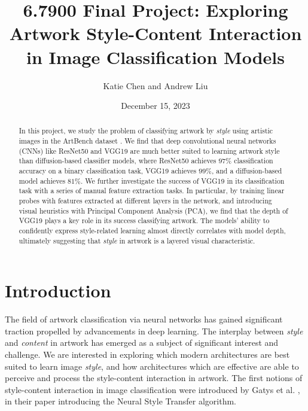 \documentclass[twocolumn]{article}
\title{{\LARGE 6.7900 Final Project: Exploring Artwork Style-Content Interaction in Image Classification Models}}
\author{Katie Chen and Andrew Liu}
\date{December 15, 2023}
\begin{document}
\maketitle

\begin{abstract}

In this project, we study the problem of classifying artwork by \textit{style} using artistic images in the ArtBench dataset \cite{liaoArtBenchDatasetBenchmarking2022a}. We find that deep convolutional neural networks (CNNs) like ResNet50 \cite{heDeepResidualLearning2015} and VGG19 \cite{simonyanVeryDeepConvolutional2014} are much better suited to learning artwork style than diffusion-based classifier models, where ResNet50 achieves $97\%$ classification accuracy on a binary classification task, VGG19 achieves $99\%$, and a diffusion-based model achieves $81\%$. We further investigate the success of VGG19 in its classification task with a series of manual feature extraction tasks. In particular, by training linear probes with features extracted at different layers in the network, and introducing visual heuristics with Principal Component Analysis (PCA), we find that the depth of VGG19 plays a key role in its success classifying artwork. The models' ability to confidently express style-related learning almost directly correlates with model depth, ultimately suggesting that \textit{style} in artwork is a layered visual characteristic. 

\end{abstract}

\section{Introduction}
The field of artwork classification via neural networks has gained significant traction propelled by advancements in deep learning. The interplay between \textit{style} and \textit{content} in artwork has emerged as a subject of significant interest and challenge. We are interested in exploring which modern architectures are best suited to learn image \textit{style}, and how architectures which are effective are able to perceive and process the style-content interaction in artwork. The first notions of style-content interaction in image classification were introduced by Gatys et al. \cite{gatysNeuralAlgorithmArtistic2015}, in their paper introducing the Neural Style Transfer algorithm.
\end{document}
